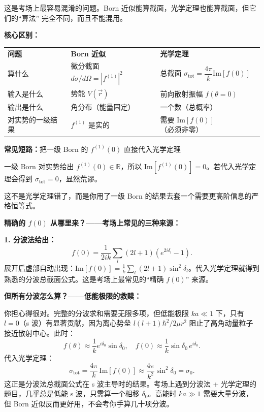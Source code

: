 \begin{derivationbox}

这是考场上最容易混淆的问题。Born 近似能算截面，光学定理也能算截面，但它们的``算法'' 完全不同，而且不能混用。

\textbf{核心区别：}

\begin{tabular}{lll}
\textbf{问题} & \textbf{Born 近似} & \textbf{光学定理} \\
算什么 & 微分截面 $d\sigma/d\Omega = |f^{(1)}|^2$ & 总截面 $\sigma_{\text{tot}} = \dfrac{4\pi}{k}\text{Im}[f(0)]$ \\
输入是什么 & 势能 $V(\vec{r})$ & 前向散射振幅 $f(\theta = 0)$ \\
输出是什么 & 角分布（能量固定） & 一个数（总概率） \\
对实势的一级结果 & $f^{(1)}$ 是实的 & 需要 $\text{Im}[f(0)]$（必须非零） \\
\end{tabular}

\textbf{常见短路：}把一级 Born 的 $f^{(1)}(0)$ 直接代入光学定理

一级 Born 对实势给出 $f^{(1)}(0) \in \mathbb{R}$，所以 $\text{Im}[f^{(1)}(0)] = 0$。若代入光学定理会得到 $\sigma_{\text{tot}} = 0$，显然荒谬。

这不是光学定理错了，而是你用了一级 Born 的结果去套一个需要更高阶信息的严格恒等式。

\textbf{精确的 $f(0)$ 从哪里来？——考场上常见的三种来源：}

\textbf{1. 分波法给出：}
\[
f(0) = \frac{1}{2ik} \sum_l (2l+1)(e^{2i\delta_l} - 1).
\]
展开后虚部自动出现：$\text{Im}[f(0)] = \frac{1}{k}\sum_l (2l+1)\sin^2\delta_l$。代入光学定理就得到熟悉的分波总截面公式。这是考场上最常见的``精确 $f(0)$'' 来源。

\textbf{但所有分波怎么算？——低能极限的救赎：}

你担心得很对。完整的分波求和需要无限多项，但低能极限 $ka \ll 1$ 下，只有 $l = 0$（s 波）有显著贡献，因为离心势垒 $l(l+1)\hbar^2/2\mu r^2$ 阻止了高角动量粒子接近散射中心。此时：
\[
f(\theta) \approx \frac{1}{k} e^{i\delta_0}\sin\delta_0, \quad f(0) \approx \frac{1}{k}\sin\delta_0\, e^{i\delta_0}.
\]
代入光学定理：
\[
\sigma_{\text{tot}} = \frac{4\pi}{k}\, \text{Im}[f(0)] \approx \frac{4\pi}{k^2}\sin^2\delta_0 = \sigma_0.
\]
这正是分波法总截面公式在 s 波主导时的结果。考场上遇到分波法 + 光学定理的题目，几乎总是低能 s 波，只需算一个相移 $\delta_0$。高能时 $ka \gg 1$ 需要大量分波，但 Born 近似反而更好用，不会考你手算几十项分波。


\end{derivationbox}
